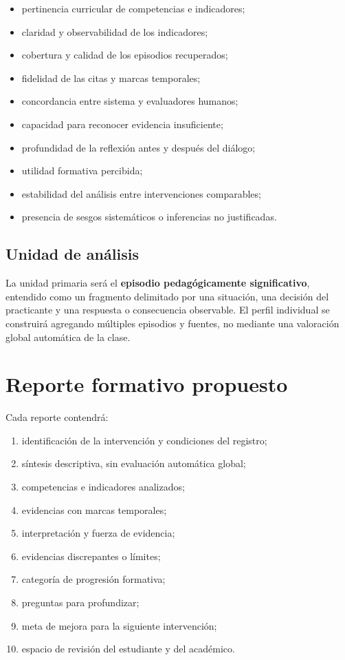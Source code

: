 \documentclass[11pt,a4paper]{article}
\begin{document}
\begin{itemize}
    \item pertinencia curricular de competencias e indicadores;
    \item claridad y observabilidad de los indicadores;
    \item cobertura y calidad de los episodios recuperados;
    \item fidelidad de las citas y marcas temporales;
    \item concordancia entre sistema y evaluadores humanos;
    \item capacidad para reconocer evidencia insuficiente;
    \item profundidad de la reflexión antes y después del diálogo;
    \item utilidad formativa percibida;
    \item estabilidad del análisis entre intervenciones comparables;
    \item presencia de sesgos sistemáticos o inferencias no justificadas.
\end{itemize}

\subsection{Unidad de análisis}

La unidad primaria será el \textbf{episodio pedagógicamente significativo}, entendido como un fragmento delimitado por una situación, una decisión del practicante y una respuesta o consecuencia observable. El perfil individual se construirá agregando múltiples episodios y fuentes, no mediante una valoración global automática de la clase.

\section{Reporte formativo propuesto}

Cada reporte contendrá:

\begin{enumerate}
    \item identificación de la intervención y condiciones del registro;
    \item síntesis descriptiva, sin evaluación automática global;
    \item competencias e indicadores analizados;
    \item evidencias con marcas temporales;
    \item interpretación y fuerza de evidencia;
    \item evidencias discrepantes o límites;
    \item categoría de progresión formativa;
    \item preguntas para profundizar;
    \item meta de mejora para la siguiente intervención;
    \item espacio de revisión del estudiante y del académico.
\end{enumerate}
\end{document}
